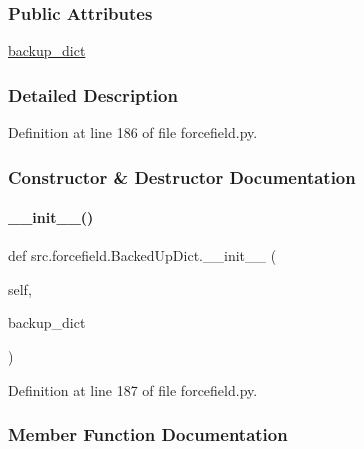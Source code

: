 \subsubsection*{Public Attributes}
\begin{DoxyCompactItemize}
\item 
\hyperlink{classsrc_1_1forcefield_1_1BackedUpDict_addf8540237840c1a5d7f0b3a58002687}{backup\+\_\+dict}
\end{DoxyCompactItemize}


\subsubsection{Detailed Description}


Definition at line 186 of file forcefield.\+py.



\subsubsection{Constructor \& Destructor Documentation}
\mbox{\label{classsrc_1_1forcefield_1_1BackedUpDict_a6c16265b50936113290b8ce22ed13aef}} 
\paragraph{\texorpdfstring{\+\_\+\+\_\+init\+\_\+\+\_\+()}{\_\_init\_\_()}}
{\footnotesize\ttfamily def src.\+forcefield.\+Backed\+Up\+Dict.\+\_\+\+\_\+init\+\_\+\+\_\+ (\begin{DoxyParamCaption}\item[{}]{self,  }\item[{}]{backup\+\_\+dict }\end{DoxyParamCaption})}



Definition at line 187 of file forcefield.\+py.



\subsubsection{Member Function Documentation}
\mbox{\label{classsrc_1_1forcefield_1_1BackedUpDict_a8f8f5c26fe07656e091ab57c0504121f}} 
